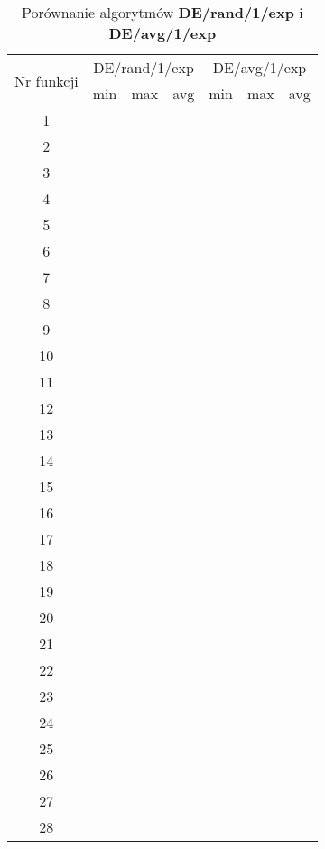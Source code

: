 \documentclass[a4paper,12pt]{article}
\theoremstyle{definition}
\begin{document}
\begin{table}[H]
\centering
\def\arraystretch{1.3}
\setlength\tabcolsep{10pt}
\caption{Porównanie algorytmów \textbf{DE/rand/1/exp} i \textbf{DE/avg/1/exp}}
\vspace{8pt}
\begin{tabular}{|c|c|c|c|c|c|c|}
	
	\hline
	\multirow{2}{*}{Nr funkcji} & \multicolumn{3}{c|}{DE/rand/1/exp} & \multicolumn{3}{c|}{DE/avg/1/exp}\\
	\cline{2-7}
	& min & max & avg & min & max & avg\\
	\hline
	1 &  &  &  &  &  &  \\
	\hline
	2 &  &  &  &  &  &  \\
	\hline
	3 &  &  &  &  &  &  \\
	\hline
	4 &  &  &  &  &  &  \\
	\hline
	5 &  &  &  &  &  &  \\
	\hline
	6 &  &  &  &  &  &  \\
	\hline
	7 &  &  &  &  &  &  \\
	\hline
	8 &  &  &  &  &  &  \\
	\hline
	9 &  &  &  &  &  &  \\
	\hline
	10 &  &  &  &  &  &  \\
	\hline
	11 &  &  &  &  &  &  \\
	\hline
	12 &  &  &  &  &  &  \\
	\hline
	13 &  &  &  &  &  &  \\
	\hline
	14 &  &  &  &  &  &  \\
	\hline
	15 &  &  &  &  &  &  \\
	\hline
	16 &  &  &  &  &  &  \\
	\hline
	17 &  &  &  &  &  &  \\
	\hline
	18 &  &  &  &  &  &  \\
	\hline
	19 &  &  &  &  &  &  \\
	\hline
	20 &  &  &  &  &  &  \\
	\hline
	21 &  &  &  &  &  &  \\
	\hline
	22 &  &  &  &  &  &  \\
	\hline
	23 &  &  &  &  &  &  \\
	\hline
	24 &  &  &  &  &  &  \\
	\hline
	25 &  &  &  &  &  &  \\
	\hline
	26 &  &  &  &  &  &  \\
	\hline
	27 &  &  &  &  &  &  \\
	\hline
	28 &  &  &  &  &  &  \\
	\hline
\end{tabular}	
\end{table}
\end{document}
